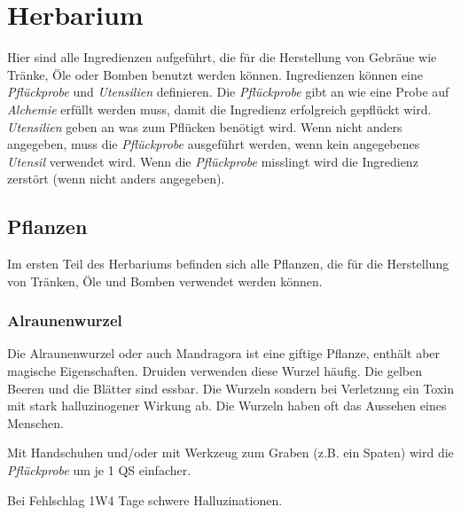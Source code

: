 {\let\clearpage\relax\chapter{Herbarium}}
Hier sind alle Ingredienzen aufgeführt, die für die Herstellung von Gebräue wie Tränke, Öle oder Bomben benutzt werden können. Ingredienzen können eine \textit{Pflückprobe} und \textit{Utensilien} definieren. Die \textit{Pflückprobe} gibt an wie eine Probe auf \textit{Alchemie} erfüllt werden muss, damit die Ingredienz erfolgreich gepflückt wird. \textit{Utensilien} geben an was zum Pflücken benötigt wird. Wenn nicht anders angegeben, muss die \textit{Pflückprobe} ausgeführt werden, wenn kein angegebenes \textit{Utensil} verwendet wird. Wenn die \textit{Pflückprobe} misslingt wird die Ingredienz zerstört (wenn nicht anders angegeben).

\section{Pflanzen}
Im ersten Teil des Herbariums befinden sich alle Pflanzen, die für die Herstellung von Tränken, Öle und Bomben verwendet werden können.

\subsection{Alraunenwurzel}
Die Alraunenwurzel oder auch Mandragora ist eine giftige Pflanze, enthält aber magische Eigenschaften. Druiden verwenden diese Wurzel häufig. Die gelben Beeren und die Blätter sind essbar. Die Wurzeln sondern bei Verletzung ein Toxin mit stark halluzinogener Wirkung ab. Die Wurzeln haben oft das Aussehen eines Menschen.

Mit Handschuhen und/oder mit Werkzeug zum Graben (z.B. ein Spaten) wird die \textit{Pflückprobe} um je 1 QS einfacher.

Bei Fehlschlag 1W4 Tage schwere Halluzinationen.

